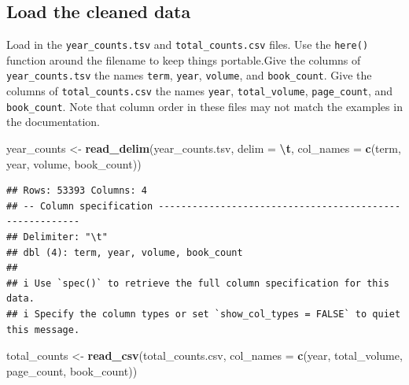 \documentclass[
]{article}
\newenvironment{Shaded}{\begin{snugshade}}{\end{snugshade}}
\newcommand{\AttributeTok}[1]{\textcolor[rgb]{0.13,0.29,0.53}{#1}}
\newcommand{\FunctionTok}[1]{\textcolor[rgb]{0.13,0.29,0.53}{\textbf{#1}}}
\newcommand{\NormalTok}[1]{#1}
\newcommand{\OtherTok}[1]{\textcolor[rgb]{0.56,0.35,0.01}{#1}}
\newcommand{\SpecialCharTok}[1]{\textcolor[rgb]{0.81,0.36,0.00}{\textbf{#1}}}
\newcommand{\StringTok}[1]{\textcolor[rgb]{0.31,0.60,0.02}{#1}}
\begin{document}
\hypertarget{load-the-cleaned-data}{%
\subsection{Load the cleaned data}\label{load-the-cleaned-data}}

Load in the \texttt{year\_counts.tsv} and \texttt{total\_counts.csv}
files. Use the \texttt{here()} function around the filename to keep
things portable.Give the columns of \texttt{year\_counts.tsv} the names
\texttt{term}, \texttt{year}, \texttt{volume}, and \texttt{book\_count}.
Give the columns of \texttt{total\_counts.csv} the names \texttt{year},
\texttt{total\_volume}, \texttt{page\_count}, and \texttt{book\_count}.
Note that column order in these files may not match the examples in the
documentation.

\begin{Shaded}
\begin{Highlighting}[]
\NormalTok{year\_counts }\OtherTok{\textless{}{-}} \FunctionTok{read\_delim}\NormalTok{(}\StringTok{\textquotesingle{}year\_counts.tsv\textquotesingle{}}\NormalTok{, }\AttributeTok{delim =} \StringTok{\textquotesingle{}}\SpecialCharTok{\textbackslash{}t}\StringTok{\textquotesingle{}}\NormalTok{, }\AttributeTok{col\_names =} \FunctionTok{c}\NormalTok{(}\StringTok{\textquotesingle{}term\textquotesingle{}}\NormalTok{, }\StringTok{\textquotesingle{}year\textquotesingle{}}\NormalTok{, }\StringTok{\textquotesingle{}volume\textquotesingle{}}\NormalTok{, }\StringTok{\textquotesingle{}book\_count\textquotesingle{}}\NormalTok{))}
\end{Highlighting}
\end{Shaded}

\begin{verbatim}
## Rows: 53393 Columns: 4
## -- Column specification --------------------------------------------------------
## Delimiter: "\t"
## dbl (4): term, year, volume, book_count
## 
## i Use `spec()` to retrieve the full column specification for this data.
## i Specify the column types or set `show_col_types = FALSE` to quiet this message.
\end{verbatim}

\begin{Shaded}
\begin{Highlighting}[]
\NormalTok{total\_counts }\OtherTok{\textless{}{-}} \FunctionTok{read\_csv}\NormalTok{(}\StringTok{\textquotesingle{}total\_counts.csv\textquotesingle{}}\NormalTok{, }\AttributeTok{col\_names =} \FunctionTok{c}\NormalTok{(}\StringTok{\textquotesingle{}year\textquotesingle{}}\NormalTok{, }\StringTok{\textquotesingle{}total\_volume\textquotesingle{}}\NormalTok{, }\StringTok{\textquotesingle{}page\_count\textquotesingle{}}\NormalTok{, }\StringTok{\textquotesingle{}book\_count\textquotesingle{}}\NormalTok{))}
\end{Highlighting}
\end{Shaded}
\end{document}
